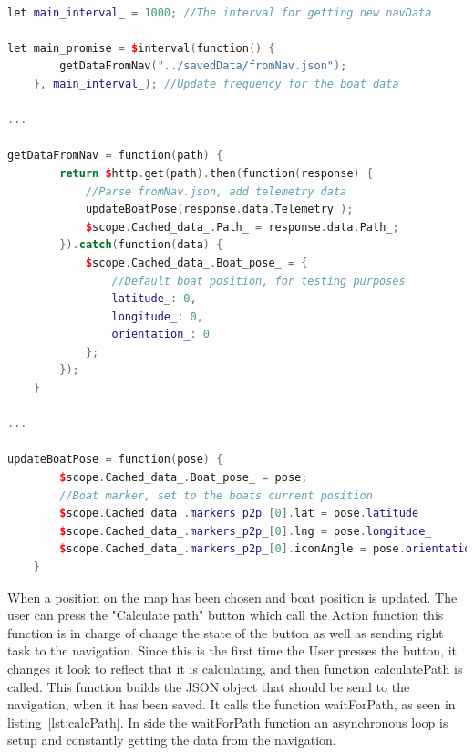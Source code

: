 \begin{lstlisting}[caption = {Updating the boat pose in p2p.js}, captionpos=b, label={lst:getData}, language=C++,firstnumber=1]

let main_interval_ = 1000; //The interval for getting new navData

let main_promise = $interval(function() {
        getDataFromNav("../savedData/fromNav.json");
    }, main_interval_); //Update frequency for the boat data

...

getDataFromNav = function(path) {
        return $http.get(path).then(function(response) {
            //Parse fromNav.json, add telemetry data
            updateBoatPose(response.data.Telemetry_);
            $scope.Cached_data_.Path_ = response.data.Path_;
        }).catch(function(data) {
            $scope.Cached_data_.Boat_pose_ = {
                //Default boat position, for testing purposes
                latitude_: 0,
                longitude_: 0,
                orientation_: 0
            };
        });
    }
    
...

updateBoatPose = function(pose) {
        $scope.Cached_data_.Boat_pose_ = pose;
        //Boat marker, set to the boats current position
        $scope.Cached_data_.markers_p2p_[0].lat = pose.latitude_
        $scope.Cached_data_.markers_p2p_[0].lng = pose.longitude_
        $scope.Cached_data_.markers_p2p_[0].iconAngle = pose.orientation_
    }
\end{lstlisting}

When a position on the map has been chosen and boat position is updated. The user can press the "Calculate path" button which call the Action function this function is in charge of change the state of the button as well as sending right task to the navigation. Since this is the first time the User presses the button, it changes it look to reflect that it is calculating, and then function calculatePath is called. This function builds the JSON object that should be send to the navigation, when it has been saved. It calls the function waitForPath, as seen in listing~\ref{lst:calcPath}. In side the waitForPath function an asynchronous loop is setup and constantly getting the data from the navigation. 

